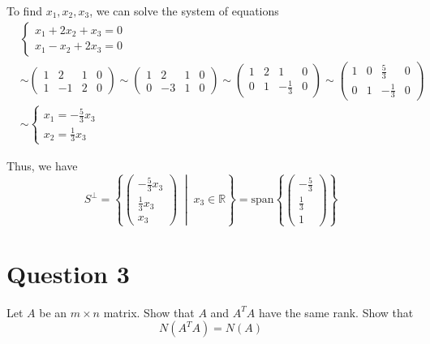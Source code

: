 \documentclass{article}
\begin{document}
To find $x_1, x_2, x_3$, we can solve the system of equations
\begin{align*}
    &\begin{cases}
        x_1 + 2x_2 + x_3 = 0 \\
        x_1 - x_2 + 2x_3 = 0
    \end{cases} \\
    &\sim
    \left(\begin{array}{ccc|c} 
        1 & 2 & 1 & 0 \\
        1 & -1 & 2 & 0 
    \end{array}\right) \sim
    \left(\begin{array}{ccc|c} 
        1 & 2 & 1 & 0 \\
        0 & -3 & 1 & 0
    \end{array}\right) \sim
    \left(\begin{array}{ccc|c} 
        1 & 2 & 1 & 0 \\
        0 & 1 & -\frac{1}{3} & 0
    \end{array}\right) \sim
    \left(\begin{array}{ccc|c} 
        1 & 0 & \frac{5}{3} & 0 \\
        0 & 1 & -\frac{1}{3} & 0
    \end{array}\right) \\ &\sim
    \begin{cases}
        x_1 = -\frac{5}{3}x_3 \\
        x_2 = \frac{1}{3}x_3
    \end{cases}
\end{align*}

Thus, we have
$$ S^\perp = \left\{
    \begin{pmatrix} -\frac{5}{3}x_3 \\ \frac{1}{3}x_3 \\ x_3 \end{pmatrix} 
    \; \middle| \; 
    x_3 \in \mathbb{R}
\right\} = \text{span} \left\{
    \begin{pmatrix} -\frac{5}{3} \\ \frac{1}{3} \\ 1 \end{pmatrix}
\right\} $$

\section*{Question 3}
Let $A$ be an $m \times n$ matrix.
Show that $A$ and $A^TA$ have the same rank.
Show that $$ N(A^T A) = N(A) $$
\end{document}
